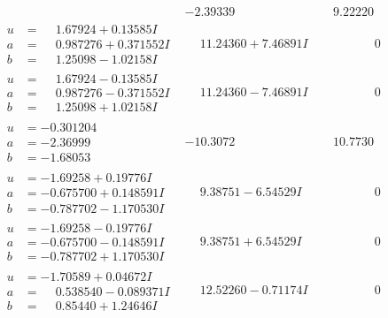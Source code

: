 \documentclass[1p]{elsarticle_modified}
\theoremstyle{definition}
\begin{document}
$$\begin{array}{c|c|c}
 & -2.39339\phantom{ +0.000000I} & \phantom{-}9.22220\phantom{ +0.000000I} \\ \hline\begin{aligned}
u &= \phantom{-}1.67924 + 0.13585 I \\
a &= \phantom{-}0.987276 + 0.371552 I \\
b &= \phantom{-}1.25098 - 1.02158 I\end{aligned}
 & \phantom{-}11.24360 + 7.46891 I & \phantom{-0.000000 } 0 \\ \hline\begin{aligned}
u &= \phantom{-}1.67924 - 0.13585 I \\
a &= \phantom{-}0.987276 - 0.371552 I \\
b &= \phantom{-}1.25098 + 1.02158 I\end{aligned}
 & \phantom{-}11.24360 - 7.46891 I & \phantom{-0.000000 } 0 \\ \hline\begin{aligned}
u &= -0.301204\phantom{ +0.000000I} \\
a &= -2.36999\phantom{ +0.000000I} \\
b &= -1.68053\phantom{ +0.000000I}\end{aligned}
 & -10.3072\phantom{ +0.000000I} & \phantom{-}10.7730\phantom{ +0.000000I} \\ \hline\begin{aligned}
u &= -1.69258 + 0.19776 I \\
a &= -0.675700 + 0.148591 I \\
b &= -0.787702 - 1.170530 I\end{aligned}
 & \phantom{-}9.38751 - 6.54529 I & \phantom{-0.000000 } 0 \\ \hline\begin{aligned}
u &= -1.69258 - 0.19776 I \\
a &= -0.675700 - 0.148591 I \\
b &= -0.787702 + 1.170530 I\end{aligned}
 & \phantom{-}9.38751 + 6.54529 I & \phantom{-0.000000 } 0 \\ \hline\begin{aligned}
u &= -1.70589 + 0.04672 I \\
a &= \phantom{-}0.538540 - 0.089371 I \\
b &= \phantom{-}0.85440 + 1.24646 I\end{aligned}
 & \phantom{-}12.52260 - 0.71174 I & \phantom{-0.000000 } 0 \\ \hline\begin{aligned}

\end{aligned}
\end{array}$$
\end{document}
